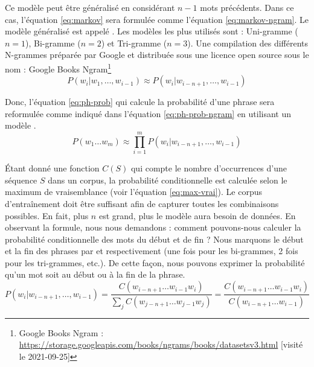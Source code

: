 \documentclass{KodeBook}
\begin{document}
Ce modèle peut être généralisé en considérant $n-1$ mots précédents. 
Dans ce cas, l'équation \ref{eq:markov} sera formulée comme l'équation \ref{eq:markov-ngram}.
Le modèle généralisé est appelé .
Les modèles les plus utilisés sont : Uni-gramme ($n=1$), Bi-gramme ($n=2$) et Tri-gramme ($n=3$).
Une compilation des différents N-grammes préparée par Google et distribuée sous une licence open source sous le nom : Google Books Ngram\footnote{Google Books Ngram : \url{https://storage.googleapis.com/books/ngrams/books/datasetsv3.html} [visité le 2021-09-25]}
\begin{equation}
	P(w_i | w_1,\ldots, w_{i-1}) \approx P(w_i | w_{i-n+1}, \ldots, w_{i-1})
	\label{eq:markov-ngram}
\end{equation}

Donc, l'équation \ref{eq:ph-prob} qui calcule la probabilité d'une phrase sera reformulée comme indiqué dans l'équation \ref{eq:ph-prob-ngram} en utilisant un modèle .
\begin{equation}\label{eq:ph-prob-ngram}
	P(w_1 \ldots w_m) \approx \prod_{i=1}^{m} P(w_i | w_{i-n+1}, \ldots, w_{i-1})
\end{equation}

Étant donné une fonction $C(S)$ qui compte le nombre d'occurrences d'une séquence $S$ dans un corpus, la probabilité conditionnelle est calculée selon le maximum de vraisemblance (voir l'équation \ref{eq:max-vrai}).
Le corpus d'entraînement doit être suffisant afin de capturer toutes les combinaisons possibles. 
En fait, plus $n$ est grand, plus le modèle aura besoin de données.
En observant la formule, nous nous demandons : comment pouvons-nous calculer la probabilité conditionnelle des mots du début et de fin ?
Nous marquons le début et la fin des phrases par  et  respectivement (une fois pour les bi-grammes, 2 fois pour les tri-grammes, etc.). 
De cette façon, nous pouvons exprimer la probabilité qu'un mot soit au début ou à la fin de la phrase.
\begin{equation}
	P(w_i | w_{i-n+1},\ldots, w_{i-1}) 
	= \frac{C(w_{i-n+1} \ldots w_{i-1} w_i)}{\sum_j C(w_{j-n+1} \ldots w_{j-1} w_j)}
	= \frac{C(w_{i-n+1} \ldots w_{i-1} w_i)}{C(w_{i-n+1} \ldots w_{i-1})}
	\label{eq:max-vrai}
\end{equation}
\end{document}
